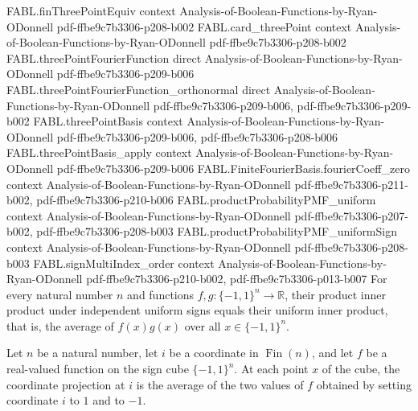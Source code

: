 \begin{theorem}
\proofstep
  {FABL.finThreePointEquiv}
  {context}
  {Analysis-of-Boolean-Functions-by-Ryan-ODonnell}
  {pdf-ffbe9c7b3306-p208-b002}
\proofstep
  {FABL.card_threePoint}
  {context}
  {Analysis-of-Boolean-Functions-by-Ryan-ODonnell}
  {pdf-ffbe9c7b3306-p208-b002}
\proofstep
  {FABL.threePointFourierFunction}
  {direct}
  {Analysis-of-Boolean-Functions-by-Ryan-ODonnell}
  {pdf-ffbe9c7b3306-p209-b006}
\proofstep
  {FABL.threePointFourierFunction_orthonormal}
  {direct}
  {Analysis-of-Boolean-Functions-by-Ryan-ODonnell}
  {pdf-ffbe9c7b3306-p209-b006,
    pdf-ffbe9c7b3306-p209-b002}
\proofstep
  {FABL.threePointBasis}
  {context}
  {Analysis-of-Boolean-Functions-by-Ryan-ODonnell}
  {pdf-ffbe9c7b3306-p209-b006,
    pdf-ffbe9c7b3306-p208-b006}
\proofstep
  {FABL.threePointBasis_apply}
  {context}
  {Analysis-of-Boolean-Functions-by-Ryan-ODonnell}
  {pdf-ffbe9c7b3306-p209-b006}
\proofstep
  {FABL.FiniteFourierBasis.fourierCoeff_zero}
  {context}
  {Analysis-of-Boolean-Functions-by-Ryan-ODonnell}
  {pdf-ffbe9c7b3306-p211-b002,
    pdf-ffbe9c7b3306-p210-b006}
\proofstep
  {FABL.productProbabilityPMF_uniform}
  {context}
  {Analysis-of-Boolean-Functions-by-Ryan-ODonnell}
  {pdf-ffbe9c7b3306-p207-b002,
    pdf-ffbe9c7b3306-p208-b003}
\proofstep
  {FABL.productProbabilityPMF_uniformSign}
  {context}
  {Analysis-of-Boolean-Functions-by-Ryan-ODonnell}
  {pdf-ffbe9c7b3306-p208-b003}
\proofstep
  {FABL.signMultiIndex_order}
  {context}
  {Analysis-of-Boolean-Functions-by-Ryan-ODonnell}
  {pdf-ffbe9c7b3306-p210-b002,
    pdf-ffbe9c7b3306-p013-b007}
For every natural number $n$ and functions $f,g:\{-1,1\}^n\to\mathbb R$, their product
inner product under independent uniform signs equals their uniform inner product, that
is, the average of $f(x)g(x)$ over all $x\in\{-1,1\}^n$.
\end{theorem}

\begin{theorem}
\label{FABL.coordinateProjection_uniformSign_apply}
\leanok
{}
Let $n$ be a natural number, let $i$ be a coordinate in $\operatorname{Fin}(n)$, and
let $f$ be a real-valued function on the sign cube $\{-1,1\}^n$. At each point $x$ of
the cube, the coordinate projection at $i$ is the average of the two values of $f$
obtained by setting coordinate $i$ to $1$ and to $-1$.
\end{theorem}

